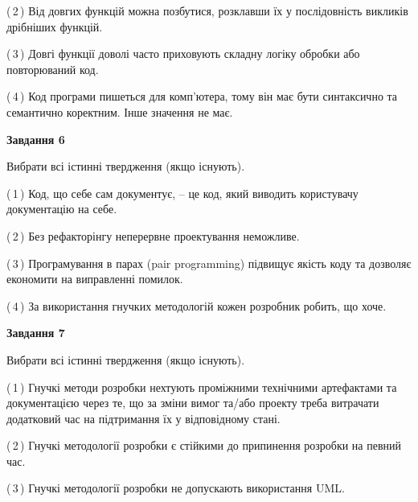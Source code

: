 \documentclass[10pt, ukrainian]{article}
\begin{document}
{\begin {large}
(\,2\,) Від довгих функцій можна позбутися, розклавши їх у послідовність викликів дрібніших функцій. %



(\,3\,) Довгі функції доволі часто приховують складну логіку обробки або повторюваний код. %



(\,4\,) Код програми пишеться для комп'ютера, тому він має бути синтаксично та семантично коректним. Інше значення не має. %

\newpage

{\begin {center}\textbf{Завдання 6}\end {center}}\par
Вибрати всі істинні твердження (якщо існують).\par
\vspace{2mm}



(\,1\,) Код, що себе сам документує, -- це код, який виводить користувачу документацію на себе. %



(\,2\,) Без рефакторінгу неперервне проектування неможливе. %



(\,3\,) Програмування в парах (pair programming) підвищує якість коду та дозволяє економити на виправленні помилок. %



(\,4\,) За використання гнучких методологій кожен розробник робить, що хоче. %


{\begin {center}\textbf{Завдання 7}\end {center}}\par
Вибрати всі істинні твердження (якщо існують).\par
\vspace{2mm}



(\,1\,) Гнучкі методи розробки нехтують проміжними технічними артефактами та документацією через те, що за зміни вимог та/або проекту треба витрачати додатковий час на підтримання їх у відповідному стані. %



(\,2\,) Гнучкі методології розробки є стійкими до припинення розробки на певний час. %



(\,3\,) Гнучкі методології розробки не допускають використання UML. %




\end{large}}
\end{document}
